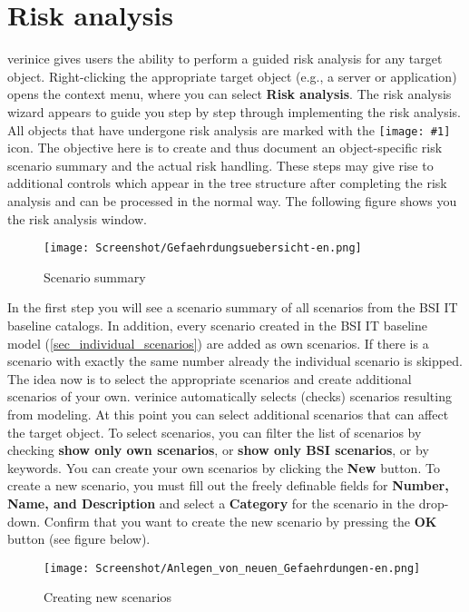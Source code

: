 \documentclass[a4paper,10pt]{book}
\newcommand{\icon}[1]{\texttt{[image: \#1]}}
\begin{document}
\section{Risk analysis} \label{sec:risk-analysis}
verinice gives users the ability to perform a guided risk analysis for any target object. Right-clicking the appropriate target object
(e.g., a server or application) opens the context menu, where you can select \textbf{Risk analysis}.
The risk analysis wizard appears to guide you step by step through implementing the risk analysis.
All objects that have undergone risk analysis are marked with the
\icon{Icon/Risikoanalyse.png} icon. The objective here is to create and thus
document an object-specific risk scenario summary and the actual risk handling. These steps may give
rise to additional controls which appear in the tree structure after completing the risk analysis
and can be processed in the normal way. The following figure shows you the risk analysis window.
\newline
\begin{figure}[htb!]
  \centering
  \texttt{[image: Screenshot/Gefaehrdungsuebersicht-en.png]}
  \caption{\label{Scenario summary} Scenario summary}
\end{figure}
\newline
In the first step you will see a scenario summary of all scenarios from the BSI IT baseline
catalogs.
In addition, every scenario created in the BSI IT baseline
model (\ref{sec_individual_scenarios}) are added as own scenarios. If there is a scenario with exactly the same number already the individual scenario is skipped.\\
The idea now is to select the appropriate scenarios and create additional scenarios
of your own. verinice automatically selects (checks) scenarios resulting from modeling.
At this point you can select additional scenarios that can affect the target object. To
select scenarios, you can filter the list of scenarios by checking \textbf{show only own scenarios}, or
\textbf{show only BSI scenarios}, or by keywords. You can create your own scenarios by clicking the
\textbf{New} button. To create a new scenario, you must fill out the freely definable fields for
\textbf{Number, Name, and Description} and select a \textbf{Category} for the scenario in the drop-down.
Confirm that you want to create the new scenario by pressing the \textbf{OK} button (see figure below).
\newline
\begin{figure}[htb!]
  \centering
  \texttt{[image: Screenshot/Anlegen\_von\_neuen\_Gefaehrdungen-en.png]}
  \caption{\label{Creating new scenarios} Creating new scenarios}
\end{figure}
\end{document}
